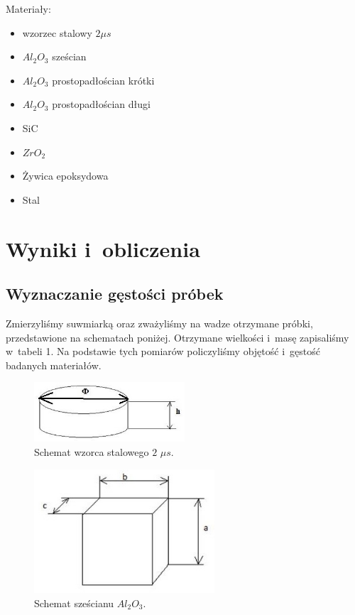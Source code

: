 \documentclass[a4paper,12pt]{article}
\begin{document}
 Materiały:
 
 \begin{itemize}
     \item wzorzec stalowy $2\mu s$
     \item $Al_2O_3$ sześcian 
     \item $Al_2O_3$ prostopadłościan krótki
     \item $Al_2O_3$ prostopadłościan długi 
     \item SiC
     \item $ZrO_2$
     \item Żywica epoksydowa 
     \item Stal 
 \end{itemize}
\newpage
 
\section{Wyniki i~obliczenia}

\subsection{Wyznaczanie gęstości próbek}

Zmierzyliśmy suwmiarką oraz zważyliśmy na wadze otrzymane próbki, przedstawione na schematach poniżej. Otrzymane wielkości i~masę zapisaliśmy w~tabeli 1. 
Na podstawie tych pomiarów policzyliśmy objętość i~gęstość badanych materiałów.

\begin{figure}[H]
    \centering
    \includegraphics[width=0.5\textwidth]{img/wzorzec.jpg}
    \caption{Schemat wzorca stalowego $2$ $\mu s$.}
\end{figure}

\begin{figure}[H]
    \centering
    \includegraphics[width=0.6\textwidth]{img/szescianAl2O3_SiC.jpg}
    \caption{Schemat sześcianu $Al_2O_3$.}
\end{figure}
\end{document}

